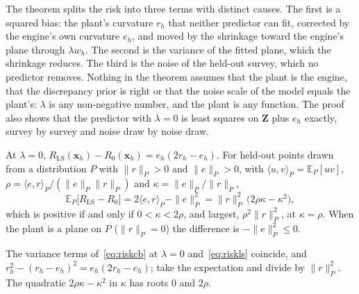 The theorem splits the risk into three terms with distinct causes. The first is a squared bias: the plant's curvature
$r_h$ that neither predictor can fit, corrected by the engine's own curvature $e_h$, and moved by the shrinkage toward the
engine's plane through $\lambda w_h$. The second is the variance of the fitted plane, which the shrinkage reduces. The third
is the noise of the held-out survey, which no predictor removes. Nothing in the theorem assumes that the plant is the engine,
that the discrepancy prior is right or that the noise scale of the model equals the plant's: $\lambda$ is any non-negative
number, and the plant is any function. The proof also shows that the predictor with $\lambda=0$ is least squares on
$\mathbf Z$ plus $e_h$ exactly, survey by survey and noise draw by noise draw.

\begin{corollary}\label{cor:align}
At $\lambda=0$, $R_{\mathrm{LS}}(\mathbf x_h)-R_0(\mathbf x_h)=e_h(2r_h-e_h)$. For held-out points drawn from a distribution
$P$ with $\|r\|_P>0$ and $\|e\|_P>0$, with $\langle u,v\rangle_P=\mathbb E_P[uv]$, $\rho=\langle e,r\rangle_P/(\|e\|_P\|r\|_P)$ and
$\kappa=\|e\|_P/\|r\|_P$,
\begin{equation}
\mathbb E_P\big[R_{\mathrm{LS}}-R_0\big]=2\langle e,r\rangle_P-\|e\|_P^2=\|r\|_P^2\,\big(2\rho\kappa-\kappa^2\big),
\label{eq:align}
\end{equation}
which is positive if and only if $0<\kappa<2\rho$, and largest, $\rho^2\|r\|_P^2$, at $\kappa=\rho$. When the plant is a
plane on $P$ ($\|r\|_P=0$) the difference is $-\|e\|_P^2\le0$.
\end{corollary}
\begin{IEEEproof}
The variance terms of~\eqref{eq:riskcb} at $\lambda=0$ and~\eqref{eq:riskls} coincide, and $r_h^2-(r_h-e_h)^2=e_h(2r_h-e_h)$;
take the expectation and divide by $\|r\|_P^2$. The quadratic $2\rho\kappa-\kappa^2$ in $\kappa$ has roots $0$ and $2\rho$.
\end{IEEEproof}

